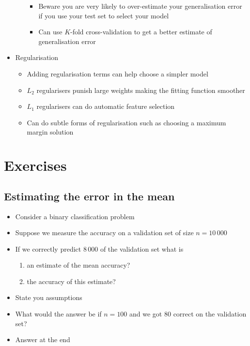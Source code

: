 \documentclass[11pt]{article}
\begin{document}
\begin{itemize}
\begin{itemize}
\begin{itemize}
\item Beware you are very likely to over-estimate your generalisation error
if you use your test set  to select your model
\item Can use \(K\)-fold cross-validation to get a better estimate of
generalisation error
\end{itemize}
\end{itemize}
\item Regularisation
\begin{itemize}
\item Adding regularisation terms can help choose a simpler model
\item \(L_2\) regularisers punish large weights making the fitting
function smoother
\item \(L_1\) regularisers can do automatic feature selection
\item Can do subtle forms of regularisation such as choosing a maximum
margin solution
\end{itemize}
\end{itemize}

\section{Exercises}
\label{sec:orgb6ebbc1}

\subsection{Estimating the error in the mean}
\label{sec:org4c29b25}

\begin{itemize}
\item Consider a binary classification problem
\item Suppose we measure the accuracy on a validation set of size \(n=10\,000\)
\item If we correctly predict \(8\,000\) of the validation set what is
\begin{enumerate}
\item an estimate of the mean accuracy?
\item the accuracy of this estimate?
\end{enumerate}
\item State you assumptions
\item What would the answer be if \(n=100\) and we got 80 correct on 
the validation set?
\item Answer at the end
\end{itemize}
\end{document}
